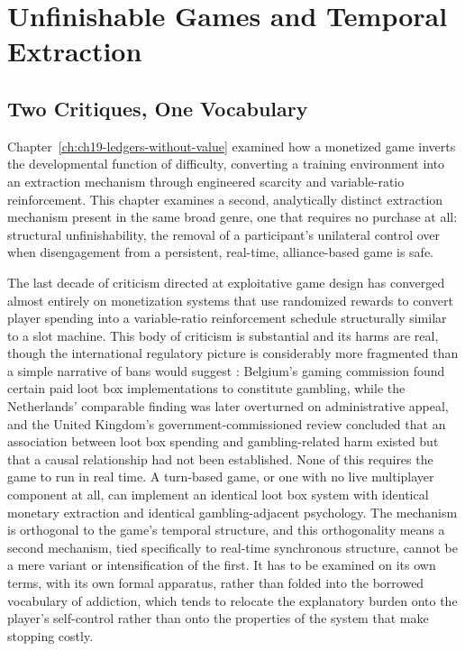 
\chapter{Unfinishable Games and Temporal Extraction}
\label{ch:ch21-unfinishable-games}
\section{Two Critiques, One Vocabulary}

Chapter~\ref{ch:ch19-ledgers-without-value} examined how a monetized game inverts the developmental function of difficulty, converting a training environment into an extraction mechanism through engineered scarcity and variable-ratio reinforcement. This chapter examines a second, analytically distinct extraction mechanism present in the same broad genre, one that requires no purchase at all: structural unfinishability, the removal of a participant's unilateral control over when disengagement from a persistent, real-time, alliance-based game is safe.

The last decade of criticism directed at exploitative game design has converged almost entirely on monetization systems that use randomized rewards to convert player spending into a variable-ratio reinforcement schedule structurally similar to a slot machine. This body of criticism is substantial and its harms are real, though the international regulatory picture is considerably more fragmented than a simple narrative of bans would suggest \cite{xiao2021}: Belgium's gaming commission found certain paid loot box implementations to constitute gambling, while the Netherlands' comparable finding was later overturned on administrative appeal, and the United Kingdom's government-commissioned review concluded that an association between loot box spending and gambling-related harm existed but that a causal relationship had not been established. None of this requires the game to run in real time. A turn-based game, or one with no live multiplayer component at all, can implement an identical loot box system with identical monetary extraction and identical gambling-adjacent psychology. The mechanism is orthogonal to the game's temporal structure, and this orthogonality means a second mechanism, tied specifically to real-time synchronous structure, cannot be a mere variant or intensification of the first. It has to be examined on its own terms, with its own formal apparatus, rather than folded into the borrowed vocabulary of addiction, which tends to relocate the explanatory burden onto the player's self-control rather than onto the properties of the system that make stopping costly.

